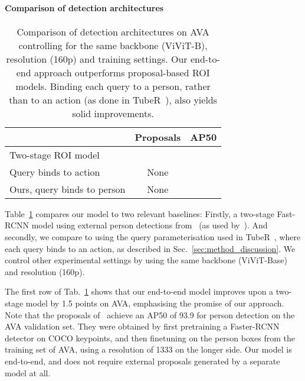 \documentclass[10pt,twocolumn,letterpaper]{article}
\def \paravspace {-0.7\baselineskip}
\begin{document}
\vspace{\paravspace}
\paragraph{Comparison of detection architectures}
\begin{table}[t]
\centering
\caption{
    Comparison of detection architectures on AVA controlling for the same backbone (ViViT-B), resolution (160p) and training settings.
    Our end-to-end approach outperforms proposal-based ROI models.
    Binding each query to a person, rather than to an action (as done in TubeR~\cite{zhao2022tuber}), also yields solid improvements.
}
\begin{tabular}{lcc}
    \toprule
                          & Proposals    & AP50 \\ 
    \midrule
    Two-stage ROI model   &  \cite{wu_cvpr_2019}            &      \\ Query binds to action &  None            &     \\  Ours, query binds to person &  None            &      \\ \bottomrule
\end{tabular}
\label{tab:ablation_detection_architectures}
\vspace{-\baselineskip}
\end{table} 
Table~\ref{tab:ablation_detection_architectures} compares our model to two relevant baselines: Firstly, a two-stage Fast-RCNN model using external person detections from~\cite{wu_cvpr_2019} (as used by~\cite{feichtenhofer_iccv_2019,fan2021multiscale,arnab2022beyond,wu_cvpr_2019}).
And secondly, we compare to using the query parameterisation used in TubeR~\cite{zhao2022tuber}, where each query binds to an action, as described in Sec.~\ref{sec:method_discussion}.
We control other experimental settings by using the same backbone (ViViT-Base) and resolution (160p).

The first row of Tab.~\ref{tab:ablation_detection_architectures} shows that our end-to-end model improves upon a two-stage model by 1.5 points on AVA, emphasising the promise of our approach.
Note that the proposals of~\cite{wu_cvpr_2019} achieve an AP50 of 93.9 for person detection on the AVA validation set.
They were obtained by first pretraining a Faster-RCNN~\cite{ren_neurips_2015} detector on COCO keypoints, and then finetuning on the person boxes from the training set of AVA, using a resolution of 1333 on the longer side.
Our model is end-to-end, and does not require external proposals generated by a separate model at all.
\end{document}
